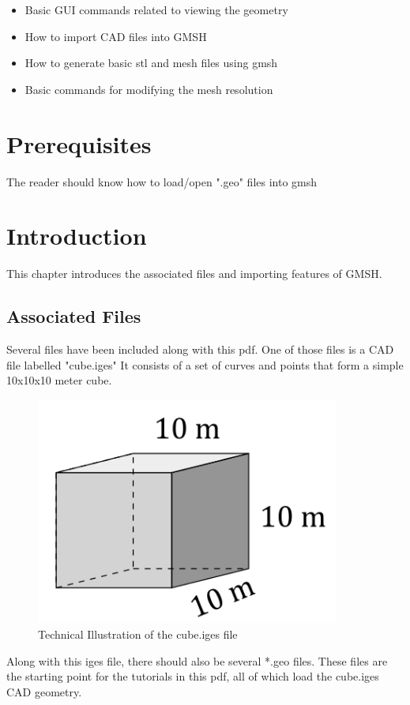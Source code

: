 \documentclass{report}
\begin{document}
\begin{itemize}
\item Basic GUI commands related to viewing the geometry
\item How to import CAD files into GMSH
\item How to generate basic stl and mesh files using gmsh
\item Basic commands for modifying the mesh resolution
\end{itemize}

\chapter*{Prerequisites}
\noindent The reader should know how to load/open ".geo" files into gmsh\\[0.4cm]
\tableofcontents


\chapter{Introduction}
This chapter introduces the associated files and importing features of GMSH.

\section{Associated Files}
Several files have been included along with this pdf. One of those files is a CAD file labelled "cube.iges" It consists of a set of curves and points that form a simple 10x10x10 meter cube.
\begin{figure}[h]
  \centering
  \includegraphics[width=10cm]{cube_tech_ill.png}
  \setcaptionwidth{10cm}
  \caption{Technical Illustration of the cube.iges file}
  \label{cube_tech_ill}
\end{figure}
Along with this iges file, there should also be several *.geo files. These files are the starting point for the tutorials in this pdf, all of which load the cube.iges CAD geometry. 
\end{document}
